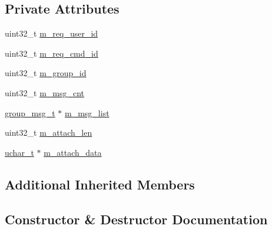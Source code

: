 \subsection*{Private Attributes}
\begin{DoxyCompactItemize}
\item 
uint32\+\_\+t \hyperlink{class_c_im_pdu_group_msg_list_response_a36ffdc04b81d17ddee6ed42519d84720}{m\+\_\+req\+\_\+user\+\_\+id}
\item 
uint32\+\_\+t \hyperlink{class_c_im_pdu_group_msg_list_response_a73aa68c3250e9f45e22bf1db22004179}{m\+\_\+req\+\_\+cmd\+\_\+id}
\item 
uint32\+\_\+t \hyperlink{class_c_im_pdu_group_msg_list_response_a5e38d0dfd2989ae2da069ad83822a24b}{m\+\_\+group\+\_\+id}
\item 
uint32\+\_\+t \hyperlink{class_c_im_pdu_group_msg_list_response_ab01059ae483ee1f1080b975af70e6106}{m\+\_\+msg\+\_\+cnt}
\item 
\hyperlink{structgroup__msg__t}{group\+\_\+msg\+\_\+t} $\ast$ \hyperlink{class_c_im_pdu_group_msg_list_response_a76700627ef0b396bb9bb75b6f0811457}{m\+\_\+msg\+\_\+list}
\item 
uint32\+\_\+t \hyperlink{class_c_im_pdu_group_msg_list_response_a5453473d17de42679a1f1997485cd4a8}{m\+\_\+attach\+\_\+len}
\item 
\hyperlink{base_2ostype_8h_a124ea0f8f4a23a0a286b5582137f0b8d}{uchar\+\_\+t} $\ast$ \hyperlink{class_c_im_pdu_group_msg_list_response_ae8f53e42de4b4f703e9cf054c75dbc66}{m\+\_\+attach\+\_\+data}
\end{DoxyCompactItemize}
\subsection*{Additional Inherited Members}


\subsection{Constructor \& Destructor Documentation}
\hypertarget{class_c_im_pdu_group_msg_list_response_a1e526b7de285a573d42c16e79287ca5f}{}
